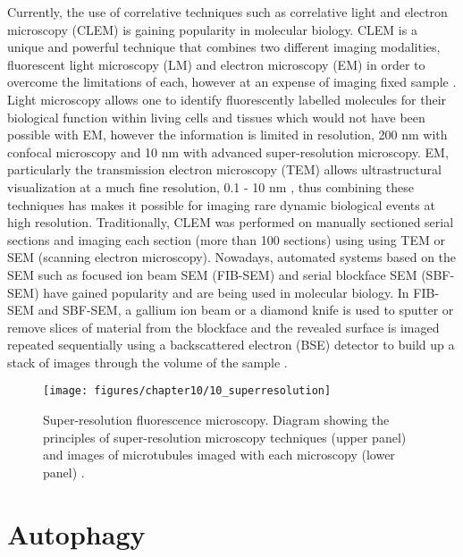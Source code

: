 Currently, the use of correlative techniques such as correlative light and electron microscopy (CLEM) is gaining popularity in molecular biology. CLEM is a unique and powerful technique that combines two different imaging modalities, fluorescent light microscopy (LM) and electron microscopy (EM) in order to overcome the limitations of each, however at an expense of imaging fixed sample \citep{Russell2017}. Light microscopy allows one to identify fluorescently labelled molecules for their biological function within living cells and tissues which would not have been possible with EM, however the information is limited in resolution, 200 nm with confocal microscopy and 10 nm with advanced super-resolution microscopy.  EM, particularly the transmission electron microscopy (TEM) allows ultrastructural visualization at a much fine resolution, 0.1 - 10 nm \citep{Feng2018}, thus combining these techniques has makes it possible for imaging rare dynamic biological events at high resolution. Traditionally, CLEM was performed on manually sectioned serial sections and imaging each section (more than 100 sections) using using TEM or SEM (scanning electron microscopy). Nowadays, automated systems  based on the SEM such as focused ion beam SEM (FIB-SEM) \citep{Heymann2006} and serial blockface SEM (SBF-SEM) \citep{Denk2004} have gained popularity and are being used in molecular biology. In FIB-SEM and SBF-SEM, a gallium ion beam  or a diamond knife is used to sputter or remove slices of material from the blockface and the revealed surface is imaged repeated sequentially using a backscattered electron (BSE) detector to build up a stack of images through the volume of the sample \citep{Russell2017}.

\begin{figure}[!htbp]
  \texttt{[image: figures/chapter10/10\_superresolution]}
  \caption[Super-resolution fluorescence microscopy.]{Super-resolution fluorescence microscopy. Diagram showing the principles of super-resolution microscopy techniques (upper panel) and images  of microtubules imaged with each microscopy (lower panel) \citep{Feng2018}.}
  \label{fig:10_superresolution}
\end{figure}

\section{Autophagy}
